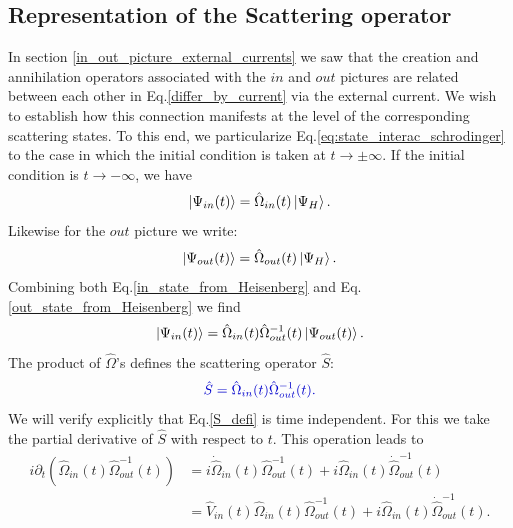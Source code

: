 \documentclass[12pt, titlepage]{article}
\begin{document}
\subsection{Representation of the Scattering operator}\label{Connections}
In section \ref{in_out_picture_external_currents} we saw that the creation and annihilation operators associated with the $ in $ and $ out $ pictures are related between each other in Eq.\enskip\eqref{differ_by_current} via the external current. 
We wish to establish how this connection manifests at the level of the corresponding scattering states. To this end, we particularize Eq.\enskip\eqref{eq:state_interac_schrodinger} to the case in which the initial condition is taken at $ t \rightarrow \pm \infty $.
If the initial condition is $ t \rightarrow - \infty $, we have
\begin{equation}\label{in_state_from_Heisenberg}
\ket{\Psi_{in}(t)}=\hat{\Omega}_{in}(t)\ket{\Psi_{H}}.
\end{equation}
Likewise for the $ out $ picture we write:
\begin{equation}\label{out_state_from_Heisenberg}
\ket{\Psi_{out}(t)}=\hat{\Omega}_{out}(t)\ket{\Psi_{H}}.
\end{equation}
Combining both Eq.\enskip\eqref{in_state_from_Heisenberg} and Eq.\enskip\eqref{out_state_from_Heisenberg} we find
\begin{equation}
\ket{\Psi_{in}(t)}=\hat{\Omega}_{in}(t)\hat{\Omega}^{-1}_{out}(t)\ket{\Psi_{out}(t)}.
\end{equation}
The product of $ \hat{\Omega} $'s defines the scattering operator $ \hat{S} $:%
\begin{equation}\label{S_defi}
\textcolor[RGB]{0,0,204}{
	\hat{S}=
	\hat{\Omega}_{in}(t)\hat{\Omega}^{-1}_{out}(t)
	.
}
\end{equation}
We will verify explicitly that Eq.\enskip\eqref{S_defi} is  time independent. For this we take the partial derivative of $ \hat{S} $ with respect to $ t $. This operation leads to
\begin{equation}\label{partial_t_for_indepen}
\begin{split}
i\partial_{t}
\left( \hat{\Omega}_{in}(t)\hat{\Omega}^{-1}_{out}(t) \right)
&= i\dot{\hat{\Omega}}_{in}(t)\hat{\Omega}^{-1}_{out}(t)
 	+ 
 		i\hat{\Omega}_{in}(t)\dot{\hat{\Omega}}^{-1}_{out}(t)
\\
&= \hat{V}_{in}(t)\hat{\Omega}_{in}(t)\hat{\Omega}^{-1}_{out}(t)
	+ 	
		i\hat{\Omega}_{in}(t)\dot{\hat{\Omega}}^{-1}_{out}(t)
.
\end{split}
\end{equation}
\end{document}
